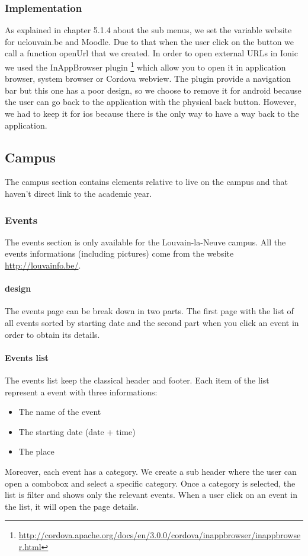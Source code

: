 \documentclass[11pt, a4paper]{report}
\begin{document}
\subsubsection{Implementation}
As explained in chapter 5.1.4 about the sub menus, we set the variable website for uclouvain.be and Moodle. Due to that when the user click on the button we call a function openUrl that we created. In order to open external URLs in Ionic we used the InAppBrowser plugin \footnote{\url{http://cordova.apache.org/docs/en/3.0.0/cordova/inappbrowser/inappbrowser.html}} which allow you to open it in application browser, system browser or Cordova webview. The plugin provide a navigation bar but this one has a poor design, so we choose to remove it for android because the user can go back to the application with the physical back button. However, we had to keep it for ios because there is the only way to have a way back to the application. 

\subsection{Campus}
The campus section contains elements relative to live on the campus and that haven't direct link to the academic year. 

\subsubsection{Events}
The events section is only available for the Louvain-la-Neuve campus. All the events informations (including pictures) come from the website \url{http://louvainfo.be/}.
\paragraph{design}
The events page can be break down in two parts. The first page with the list of all events sorted by starting date and the second part when you click an event in order to obtain its details. 
\paragraph{Events list}
The events list keep the classical header and footer. Each item of the list represent a event with three informations:
\begin{itemize}
\item The name of the event
\item The starting date (date + time)
\item The place
\end{itemize}
Moreover, each event has a category. We create a sub header where the user can open a combobox and select a specific category. Once a category is selected, the list is filter and shows only the relevant events. When a user click on an event in the list, it will open the page details.
\end{document}
